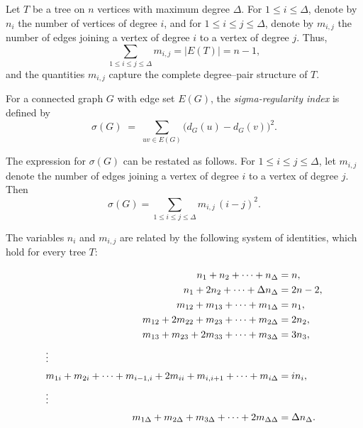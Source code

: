 \documentclass[preprint,12pt]{elsarticle}
\begin{document}
Let $T$ be a tree on $n$ vertices with maximum degree $\Delta$.  
For $1\le i\le \Delta$, denote by $n_i$ the number of vertices of degree $i$, and for
$1\le i\le j\le \Delta$, denote by $m_{i,j}$ the number of edges joining a vertex
of degree $i$ to a vertex of degree $j$.  
Thus,
\[
\sum_{1\le i\le j\le \Delta} m_{i,j} = |E(T)| = n-1,
\]
and the quantities $m_{i,j}$ capture the complete degree–pair structure of $T$.

\begin{definition}
\label{def:sigma}
For a connected graph $G$ with edge set $E(G)$, the \emph{sigma-regularity index}
is defined by
\begin{equation}
\label{eq:def_sigma}
\sigma(G)\;=\;\sum_{uv\in E(G)}\bigl(d_G(u)-d_G(v)\bigr)^2.
\end{equation}
\end{definition}

The expression for $\sigma(G)$ can be restated as follows. For $1\le i\le j\le \Delta$,
let $m_{i,j}$ denote the number of edges joining a vertex of degree $i$ to a vertex
of degree $j$. Then
\[
\sigma(G)
=\sum_{1\le i\le j\le \Delta} m_{i,j}\,(i-j)^2.
\]



\medskip
The variables $n_i$ and $m_{i,j}$ are related by the following system of identities, which hold for every tree $T$:

\begin{align}
n_1 + n_2 + \cdots + n_{\Delta} &= n, \label{eq:tree-sum-ni}\\
n_1 + 2n_2 + \cdots + \Delta n_{\Delta} &= 2n-2, \label{eq:tree-sum-deg}\\
m_{12} + m_{13} + \cdots + m_{1\Delta} &= n_1, \label{eq:tree-ni-1}\\
m_{12} + 2m_{22} + m_{23} + \cdots + m_{2\Delta} &= 2n_2, \label{eq:tree-ni-2}\\
m_{13} + m_{23} + 2m_{33} + \cdots + m_{3\Delta} &= 3n_3, \label{eq:tree-ni-3}\\
\intertext{\centering$\vdots$}
m_{1i}+m_{2i}+\cdots+m_{i-1,i}+2m_{ii}+m_{i,i+1}+\cdots+m_{i\Delta}
&= i n_i, \label{eq:tree-ni-i}\\
\intertext{\centering$\vdots$}
m_{1\Delta} + m_{2\Delta} + m_{3\Delta} + \cdots + 2m_{\Delta\Delta}
&= \Delta n_\Delta. \label{eq:tree-ni-Delta}
\end{align}
\end{document}
